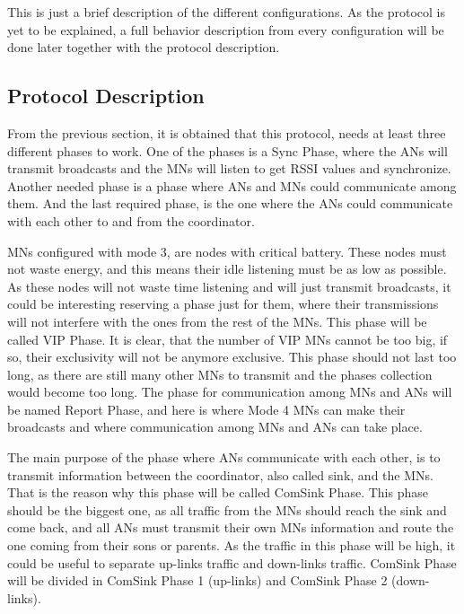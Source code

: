 This is just a brief description of the different configurations. As the protocol is yet to be explained, a full behavior description from 
every configuration will be done later together with the protocol description.

\subsection{Protocol Description}

From the previous section, it is obtained that this protocol, needs at least three different phases to work. One of the phases is a Sync 
Phase, where the \acp{AN} will transmit broadcasts and the \acp{MN} will listen to get \ac{RSSI} values and synchronize. Another needed 
phase is a phase where \acp{AN} and \acp{MN} could communicate among them. And the last required phase, is the one where the \acp{AN} could 
communicate with each other to and from the coordinator.

\acp{MN} configured with mode 3, are nodes with critical battery. These nodes must not waste energy, and this means their idle listening must be
as low as possible. As these nodes will not waste time listening and will just transmit broadcasts, it could be interesting reserving a phase
just for them, where their transmissions will not interfere with the ones from the rest of the \acp{MN}. This phase will be called \ac{VIP} 
Phase. It is clear, that the number of \ac{VIP} \acp{MN} cannot be too big, if so, their exclusivity will not be anymore exclusive.
This phase should not last too long, as there are still many other \acp{MN} to transmit and the phases collection would become too long.
The phase for communication among \acp{MN} and \acp{AN} will be named Report Phase, and here is where Mode 4 \acp{MN} can make 
their broadcasts and where communication among \acp{MN} and \acp{AN} can take place.

The main purpose of the phase where \acp{AN} communicate with each other, is to transmit information between the coordinator, also called sink, and 
the \acp{MN}. That is the reason why this phase will be called ComSink Phase. This phase should be the biggest one, as all traffic from 
the \acp{MN} should reach the sink and come back, and all \acp{AN} must transmit their own \acp{MN} information and route the one coming from
their sons or parents. As the traffic in this phase will be high, it could be useful to separate up-links traffic and down-links traffic. 
ComSink Phase will be divided in ComSink Phase 1 (up-links) and ComSink Phase 2 (down-links).

